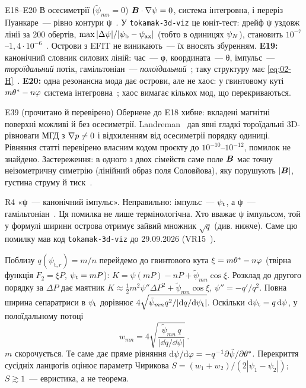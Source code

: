 \begin{established}{E18--E20}
В осесиметрії ($\tilde\psi_{mn}=0$) $\bm{B}\cdot\nabla\psi=0$, система інтегровна, і переріз Пуанкаре~--- рівно контури ψ~\cite{ProjRegisters}. У \texttt{tokamak-3d-viz} це юніт-тест: дрейф ψ уздовж лінії за 200 обертів, $\max|\Delta\psi|/|\psi_{\mathrm{b}}-\psi_{\mathrm{ax}}|$ (тобто в одиницях $\psi_{N}$), становить $10^{-7}$--$1{,}4\cdot10^{-6}$~\cite{ProjViz}. Острови з EFIT не виникають~--- їх вносять збуренням. \textbf{E19:} канонічний словник силових ліній: час~--- φ, координата~--- θ, імпульс~--- \emph{тороїдальний} потік, гамільтоніан~--- \emph{полоїдальний}~\cite{ProjRegisters}; таку структуру має \eqref{eq:02-H}~\cite{Tyshchenko2021}. \textbf{E20:} одна резонансна мода дає острови, але не хаос: у гвинтовому куті $m\theta^{*}-n\varphi$ система інтегровна~\cite{ProjRegisters,Tyshchenko2021}; хаос вимагає кількох мод, що перекриваються.
\end{established}
\begin{established}{E39 (прочитано й перевірено)}
Обернене до E18 хибне: вкладені магнітні поверхні можливі й без осесиметрії. Landreman~\cite{Landreman2026} дав явні гладкі тороїдальні 3D-рівноваги МГД з $\nabla p\ne0$ і відхиленням від осесиметрії порядку одиниці. Рівняння статті перевірено власним кодом проєкту до $10^{-10}$--$10^{-12}$, помилок не знайдено. Застереження: в одного з двох сімейств саме поле $\bm{B}$ має точну неізометричну симетрію (лінійний образ поля Соловйова), яку порушують $|\bm{B}|$, густина струму й тиск~\cite{ProjRegisters}.
\end{established}
\begin{refuted}{R4}
«ψ~--- канонічний імпульс». Неправильно: імпульс~--- $\psi_{\mathrm{t}}$, а ψ~--- гамільтоніан~\cite{ProjRegisters}. Ця помилка не лише термінологічна. Хто вважає ψ імпульсом, той у формулі ширини острова отримує зайвий множник $\sqrt q$ (див. нижче). Саме цю помилку мав код \texttt{tokamak-3d-viz} до 29.09.2026 (VR15~\cite{ProjViz}).
\end{refuted}

\begin{derivation}
Поблизу $q(\psi_{\mathrm{t},r})=m/n$ перейдемо до гвинтового кута $\xi=m\theta^{*}-n\varphi$ (твірна функція $F_2=\xi P$, $\psi_{\mathrm{t}}=mP$): $K=\psi(mP)-nP+\tilde\psi_{mn}\cos\xi$. Розклад до другого порядку за $\Delta P$ дає маятник $K\approx\tfrac12m^2\psi''\Delta P^2+\tilde\psi_{mn}\cos\xi$, $\psi''=-q'/q^2$. Повна ширина сепаратриси в $\psi_{\mathrm{t}}$ дорівнює $4\sqrt{\tilde\psi_{mn}q^2/|\mathrm{d} q/\mathrm{d}\psi_{\mathrm{t}}|}$. Оскільки $\mathrm{d}\psi_{\mathrm{t}}=q\,\mathrm{d}\psi$, у полоїдальному потоці
\begin{equation}\label{eq:02-w}
  w_{mn}=4\sqrt{\frac{\tilde\psi_{mn}\,q}{|\dd q/\dd\psi|}}\,.
\end{equation}
$m$ скорочується. Те саме дає пряме рівняння $\mathrm{d}\psi/\mathrm{d}\varphi=-q^{-1}\partial\tilde\psi/\partial\theta^{*}$. Перекриття сусідніх ланцюгів оцінює параметр Чирикова $S=(w_1+w_2)/(2|\psi_1-\psi_2|)$; $S\gtrsim1$~--- евристика, а не теорема.
\end{derivation}

